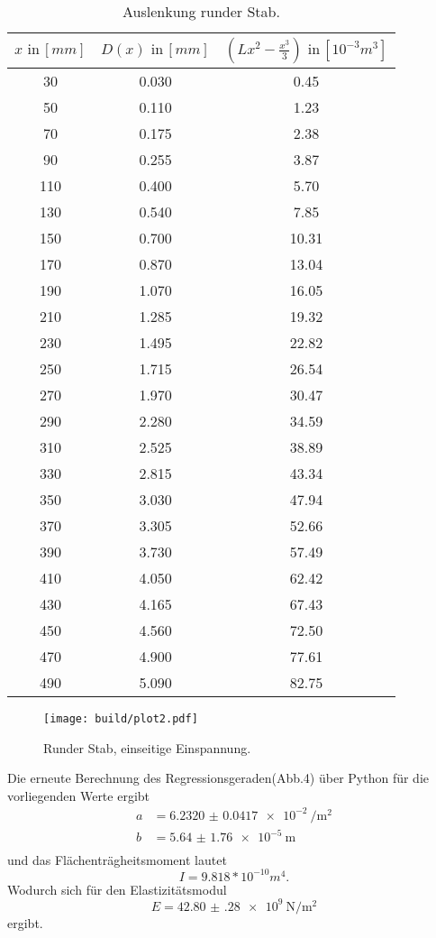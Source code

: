 \begin{table}[h]
  \centering
  \label{tab:lit3}
  \begin{tabular}{ c c c }
    \toprule
    $x \,\, \text{in} \, [mm]$
   &{$D(x) \,\, \text{in} \, [mm]$}
   &{$(Lx^2- \frac{x^3}{3}) \,\, \text{in} \, [10^{-3}m^3]$} \\

    \midrule
    30 & 0.030 & 0.45\\
    50 & 0.110 & 1.23\\
    70 & 0.175 & 2.38\\
    90 & 0.255 & 3.87\\
    110& 0.400 & 5.70\\
    130& 0.540 & 7.85\\
    150& 0.700 &10.31\\
    170& 0.870 &13.04\\
    190& 1.070 &16.05\\
    210& 1.285 &19.32\\
    230& 1.495 &22.82\\
    250& 1.715 &26.54\\
    270& 1.970 &30.47\\
    290& 2.280 &34.59\\
    310& 2.525 &38.89\\
    330& 2.815 &43.34\\
    350& 3.030 &47.94\\
    370& 3.305 &52.66\\
    390& 3.730 &57.49\\
    410& 4.050 &62.42\\
    430& 4.165 &67.43\\
    450& 4.560 &72.50\\
    470& 4.900 &77.61\\
    490& 5.090 &82.75\\

    \bottomrule
  \end{tabular}
  \caption{Auslenkung runder Stab.}
\end{table}

\begin{figure}[h]
  \centering
  \texttt{[image: build/plot2.pdf]}
  \caption{Runder Stab, einseitige Einspannung.}
  \label{fig:plot2}
\end{figure}

Die erneute Berechnung des Regressionsgeraden(Abb.4) über Python
für die vorliegenden Werte ergibt
\begin{align*}
  a &= \SI{6.2320(417)e-2}{\per\square\meter} \\
  b &= \SI{5.64(176)e-5}{\meter} \\
\end{align*}
und das Flächenträgheitsmoment lautet
\begin{equation*}
  I = 9.818* 10^{-10} m^4.
\end{equation*}
\newline
Wodurch sich für den Elastizitätsmodul
\begin{equation*}
  E = \SI{42.80(28)e9}{\newton\per\square\meter}
\end{equation*}
ergibt.
\newpage
